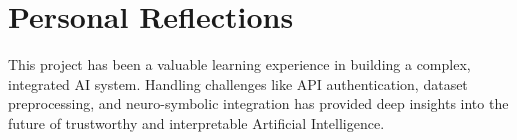 \section{Personal Reflections}
This project has been a valuable learning experience in building a complex, integrated AI system. Handling challenges like API authentication, dataset preprocessing, and neuro-symbolic integration has provided deep insights into the future of trustworthy and interpretable Artificial Intelligence.

